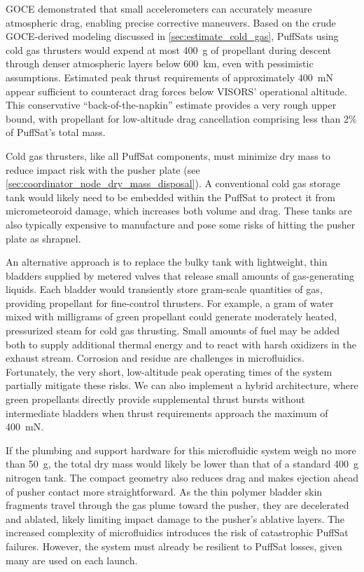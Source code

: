\documentclass{article}
\begin{document}
GOCE demonstrated that small accelerometers can accurately measure atmospheric drag, enabling precise corrective maneuvers. Based on the crude GOCE-derived modeling discussed in \autoref{sec:estimate_cold_gas}, PuffSats using cold gas thrusters would expend at most \SI{400}{\gram} of propellant during descent through denser atmospheric layers below \SI{600}{\kilo\meter}, even with pessimistic assumptions. Estimated peak thrust requirements of approximately \SI{400}{\milli\newton} appear sufficient to counteract drag forces below VISORS' operational altitude. This conservative “back-of-the-napkin” estimate provides a very rough upper bound, with propellant for low-altitude drag cancellation comprising less than 2\% of PuffSat's total mass.

Cold gas thrusters, like all PuffSat components, must minimize dry mass to reduce impact risk with the pusher plate (see \autoref{sec:coordinator_node_dry_mass_disposal}). A conventional cold gas storage tank would likely need to be embedded within the PuffSat to protect it from micrometeoroid damage, which increases both volume and drag. These tanks are also typically expensive to manufacture and pose some risks of hitting the pusher plate as shrapnel.

An alternative approach is to replace the bulky tank with lightweight, thin bladders supplied by metered valves that release small amounts of gas-generating liquids. Each bladder would transiently store gram-scale quantities of gas, providing propellant for fine-control thrusters. For example, a gram of water mixed with milligrams of green propellant could generate moderately heated, pressurized steam for cold gas thrusting. Small amounts of fuel may be added both to supply additional thermal energy and to react with harsh oxidizers in the exhaust stream.  Corrosion and residue are challenges in microfluidics. Fortunately, the very short, low-altitude peak operating times of the system partially mitigate these risks. We can also implement a hybrid architecture, where green propellants directly provide supplemental thrust bursts without intermediate bladders when thrust requirements approach the maximum of \SI{400}{\milli\newton}.

If the plumbing and support hardware for this microfluidic system weigh no more than \SI{50}{\gram}, the total dry mass would likely be lower than that of a standard \SI{400}{\gram} nitrogen tank. The compact geometry also reduces drag and makes ejection ahead of pusher contact more straightforward. As the thin polymer bladder skin fragments travel through the gas plume toward the pusher, they are decelerated and ablated, likely limiting impact damage to the pusher's ablative layers.  The increased complexity of microfluidics introduces the risk of catastrophic PuffSat failures. However, the system must already be resilient to PuffSat losses, given many are used on each launch.
\end{document}
